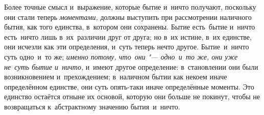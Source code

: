 Более точные смысл и~выражение, которые бытие и~ничто получают, поскольку они
стали теперь {\em моментами,} должны выступить при рассмотрении наличного
бытия, как того единства, в~котором они сохранены. Бытие есть~бытие и~ничто
есть~ничто лишь в~их~различии друг от друга; но в~их истине, в~их единстве, они
исчезли как эти определения, и~суть теперь нечто другое. Бытие~и~ничто суть
одно~и~то же; {\em именно потому, что~они "--- одно~и~то же, они уже не~суть
бытие и~ничто,} и~имеют другое определение: в~становлении они были
возникновением и~прехождением; в~наличном бытии как некоем иначе определённом
единстве, они суть опять-таки иначе определённые моменты. Это единство остаётся
отныне их основой, которую они больше не покинут, чтобы не возвращаться
к~абстрактному значению бытия~и~ничто.

\bigskip

